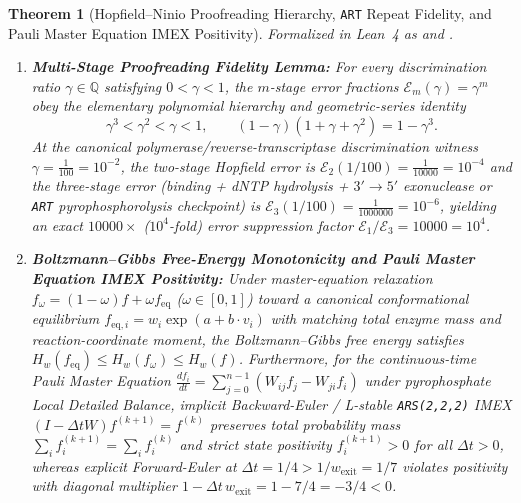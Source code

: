 \documentclass[11pt,a4paper]{article}
\newtheorem{theorem}{Theorem}[section]
\theoremstyle{definition}
\begin{document}
\begin{theorem}[Hopfield--Ninio Proofreading Hierarchy, \texttt{ART} Repeat Fidelity, and Pauli Master Equation IMEX Positivity]
\label{thm:hopfield_art_gibbs}
Formalized in Lean~4 as  and .
\begin{enumerate}
  \item \textbf{Multi-Stage Proofreading Fidelity Lemma:} For every discrimination ratio $\gamma \in \mathbb{Q}$ satisfying $0 < \gamma < 1$, the $m$-stage error fractions $\mathcal{E}_m(\gamma) = \gamma^m$ obey the elementary polynomial hierarchy and geometric-series identity
  \begin{equation}
    \gamma^3 < \gamma^2 < \gamma < 1, \qquad (1 - \gamma)(1 + \gamma + \gamma^2) = 1 - \gamma^3.
  \end{equation}
  At the canonical polymerase/reverse-transcriptase discrimination witness $\gamma = \frac{1}{100} = 10^{-2}$, the two-stage Hopfield error is $\mathcal{E}_2(1/100) = \frac{1}{10000} = 10^{-4}$ and the three-stage error (binding + dNTP hydrolysis + $3'\to 5'$ exonuclease or \texttt{ART} pyrophosphorolysis checkpoint) is $\mathcal{E}_3(1/100) = \frac{1}{1000000} = 10^{-6}$, yielding an exact $10000\times$ ($10^4$-fold) error suppression factor $\mathcal{E}_1/\mathcal{E}_3 = 10000 = 10^4$.
  \item \textbf{Boltzmann--Gibbs Free-Energy Monotonicity and Pauli Master Equation IMEX Positivity:} Under master-equation relaxation $f_\omega = (1-\omega)f + \omega f_{\mathrm{eq}}$ ($\omega \in [0,1]$) toward a canonical conformational equilibrium $f_{\mathrm{eq},i} = w_i \exp(a + b\cdot v_i)$ with matching total enzyme mass and reaction-coordinate moment, the Boltzmann--Gibbs free energy satisfies $H_w(f_{\mathrm{eq}}) \le H_w(f_\omega) \le H_w(f)$. Furthermore, for the continuous-time Pauli Master Equation $\frac{df_i}{dt} = \sum_{j=0}^{n-1}(W_{ij}f_j - W_{ji}f_i)$ under pyrophosphate Local Detailed Balance, implicit Backward-Euler / L-stable \texttt{ARS(2,2,2)} IMEX $(I - \Delta t W)f^{(k+1)} = f^{(k)}$ preserves total probability mass $\sum_i f_i^{(k+1)} = \sum_i f_i^{(k)}$ and strict state positivity $f_i^{(k+1)} > 0$ for all $\Delta t > 0$, whereas explicit Forward-Euler at $\Delta t = 1/4 > 1/w_{\mathrm{exit}} = 1/7$ violates positivity with diagonal multiplier $1 - \Delta t\,w_{\mathrm{exit}} = 1 - 7/4 = -3/4 < 0$.
\end{enumerate}
\end{theorem}
\end{document}
